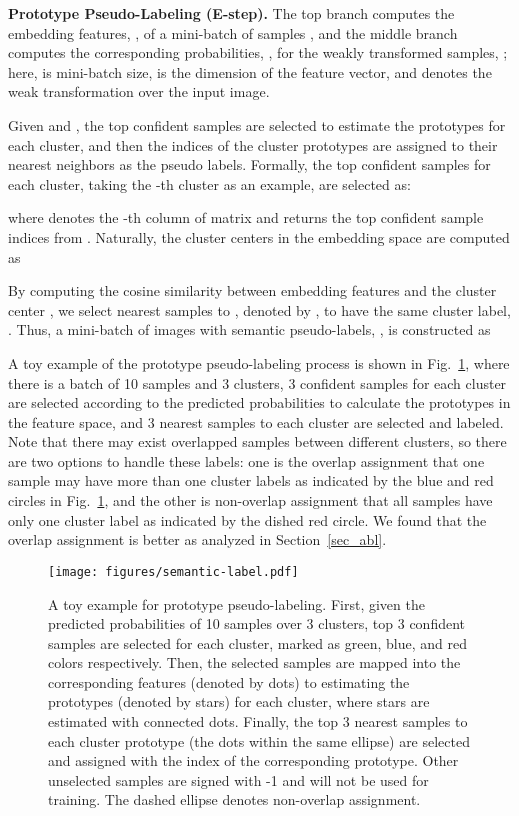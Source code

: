 \documentclass[journal]{IEEEtran}
\begin{document}
\noindent\textbf{Prototype Pseudo-Labeling (E-step).} The top branch computes the embedding features, , of a mini-batch of samples , and the middle branch computes the corresponding probabilities, , for the weakly transformed samples, ; here,  is mini-batch size,  is the dimension of the feature vector, and  denotes the weak transformation over the input image.


Given  and , the top confident samples are selected to estimate the prototypes for each cluster, and then the indices of the cluster prototypes are assigned to their nearest neighbors as the pseudo labels.
Formally, the top confident samples for each cluster, taking the -th cluster as an example, are selected as:

where  denotes the -th column of matrix  and  returns the top  confident sample indices from .
Naturally, the cluster centers  in the embedding space are computed as

By computing the cosine similarity between embedding features  and the cluster center , we select  nearest samples to , denoted by , to have the same cluster label, . Thus, a mini-batch of images with semantic pseudo-labels, , is constructed as



A toy example of the prototype pseudo-labeling process is shown in Fig.~\ref{fig_sl}, where there is a batch of 10 samples and 3 clusters, 3 confident samples for each cluster are selected according to the predicted probabilities to calculate the prototypes in the feature space, and 3 nearest samples to each cluster are selected and labeled. Note that there may exist overlapped samples between different clusters, so there are two options to handle these labels: one is the overlap assignment that one sample may have more than one cluster labels as indicated by the blue and red circles in Fig.~\ref{fig_sl}, and the other is non-overlap assignment that all samples have only one cluster label as indicated by the dished red circle. We found that the overlap assignment is better as analyzed in Section~\ref{sec_abl}.


\begin{figure}[bt!]
    \centering
    \texttt{[image: figures/semantic-label.pdf]}
    \caption{A toy example for prototype pseudo-labeling. First, given the predicted probabilities of 10 samples over 3 clusters, top 3 confident samples are selected for each cluster, marked as green, blue, and red colors respectively. Then, the selected samples are mapped into the corresponding features (denoted by dots) to estimating the prototypes (denoted by stars) for each cluster, where stars are estimated with connected dots. Finally, the top 3 nearest samples to each cluster prototype (the dots within the same ellipse) are selected and assigned with the index of the corresponding prototype. Other unselected samples are signed with -1 and will not be used for training. The dashed ellipse denotes non-overlap assignment.}
    \label{fig_sl}
\end{figure}
\end{document}
